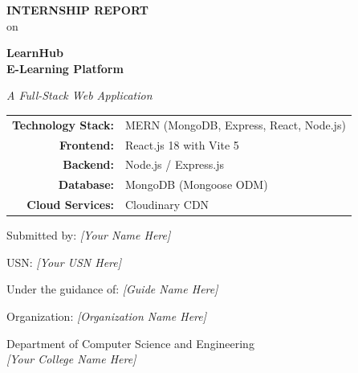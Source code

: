 \documentclass[12pt,a4paper]{report}
\begin{document}
\begin{titlepage}
\centering
\vspace*{1cm}
{\large \textbf{INTERNSHIP REPORT}\\[0.5cm]}
{\large on\\[0.5cm]}
{\Huge\bfseries LearnHub\\[0.3cm]E-Learning Platform\par}
\vspace{1cm}
{\Large\itshape A Full-Stack Web Application\par}
\vspace{1.5cm}
{\large
\begin{tabular}{rl}
\textbf{Technology Stack:} & MERN (MongoDB, Express, React, Node.js) \\
\textbf{Frontend:}         & React.js 18 with Vite 5 \\
\textbf{Backend:}          & Node.js / Express.js \\
\textbf{Database:}         & MongoDB (Mongoose ODM) \\
\textbf{Cloud Services:}   & Cloudinary CDN \\
\end{tabular}
\par}
\vspace{2cm}
{\large Submitted by: \textit{[Your Name Here]} \par}
\vspace{0.3cm}
{\large USN: \textit{[Your USN Here]} \par}
\vspace{0.3cm}
{\large Under the guidance of: \textit{[Guide Name Here]} \par}
\vspace{0.3cm}
{\large Organization: \textit{[Organization Name Here]} \par}
\vspace{1.5cm}
{\large Department of Computer Science and Engineering\\
\textit{[Your College Name Here]}\\[0.3cm]
\the\year\par}
\end{titlepage}

\end{document}

